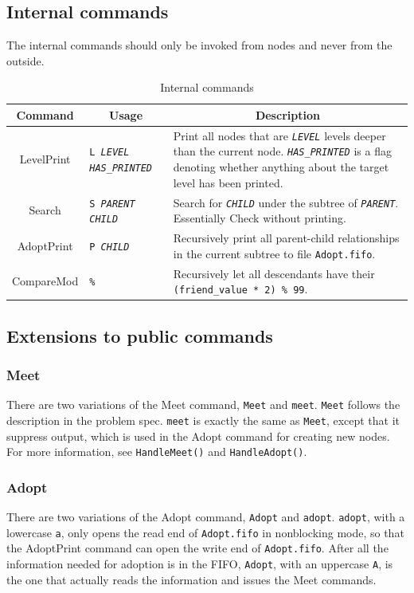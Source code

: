 \documentclass[12pt, a4paper]{article}
\newcommand*{\var}[1]{{\itshape\verb|#1|}}
\begin{document}
  \subsection{Internal commands}
  The internal commands should only be invoked from nodes and never
  from the outside.
  \begin{table}[H]
    \centering
    \caption{Internal commands}
    \begin{tabularx}{\linewidth}{|c|l|X|}
      \hline
      \textbf{Command} &
      \multicolumn{1}{c|}{\textbf{Usage}} &
      \multicolumn{1}{c|}{\textbf{Description}}
      \\\hline
      LevelPrint &
      \texttt{L \var{LEVEL} \var{HAS_PRINTED}} &
      Print all nodes that are \var{LEVEL} levels deeper than the current node.
      \var{HAS_PRINTED} is a flag denoting whether anything about the target
      level has been printed.
      \\\hline
      Search &
      \texttt{S \var{PARENT} \var{CHILD}} &
      Search for \var{CHILD} under the subtree of \var{PARENT}. Essentially
      Check without printing.
      \\\hline
      AdoptPrint &
      \texttt{P \var{CHILD}} &
      Recursively print all parent-child relationships in the current subtree
      to file \verb|Adopt.fifo|.
      \\\hline
      CompareMod &
      \texttt{\%} &
      Recursively let all descendants have their \texttt{(friend\_value * 2) \% 99}.
      \\\hline
    \end{tabularx}
  \end{table}

  \subsection{Extensions to public commands}
  \subsubsection{Meet}
  There are two variations of the Meet command, \verb|Meet| and \verb|meet|.
  \verb|Meet| follows the description in the problem spec. \verb|meet| is
  exactly the same as \verb|Meet|, except that it suppress output, which is
  used in the Adopt command for creating new nodes.
  For more information, see \verb|HandleMeet()| and \verb|HandleAdopt()|.
  \subsubsection{Adopt}
  There are two variations of the Adopt command, \verb|Adopt| and \verb|adopt|.
  \verb|adopt|, with a lowercase \verb|a|, only opens the read end of
  \verb|Adopt.fifo| in nonblocking mode, so that the AdoptPrint command can open
  the write end of \verb|Adopt.fifo|.
  After all the information needed for adoption is in the FIFO, \verb|Adopt|,
  with an uppercase \verb|A|, is the one that actually reads the information and
  issues the Meet commands.
\end{document}
